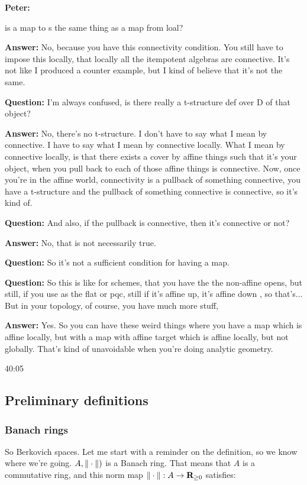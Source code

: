 \begin{example}
\textbf{Peter:} 

is a map to s the same thing as a map from loal? 

\textbf{Answer:} No, because you have this connectivity condition. You still have to impose this locally, that locally all the itempotent algebras are connective. It's not like I produced a counter example, but I kind of believe that it's not the same.

\textbf{Question:} I'm always confused, is there really a t-structure def over D of that object? 

\textbf{Answer:} No, there's no t-structure. I don't have to say what I mean by connective. I have to say what I mean by connective locally. What I mean by connective locally, is that there exists a cover by affine things such that it's your object, when you pull back to each of those affine things is connective. Now, once you're in the affine world, connectivity is a pullback of something connective, you have a t-structure and the pullback of something connective is connective, so it's kind of. 

\textbf{Question:} And also, if the pullback is connective, then it's connective or not? 

\textbf{Answer:} No, that is not necessarily true.

\textbf{Question:} So it's not a sufficient condition for having a map. 

\textbf{Question:} So this is like for schemes, that you have the the non-affine opens, but still, if you use as the flat or pqc, still if it's affine up, it's affine down , so that's... But in your topology, of course, you have much more stuff, 

\textbf{Answer:} Yes. So you can have these weird things where you have a map which is affine locally, but with a map with affine target which is affine locally, but not globally. That's kind of unavoidable when you're doing analytic geometry.

\begin{unfinished}{40:05}
\subsection{Preliminary definitions} \label{subsec:preliminary_definitions}
\subsubsection{Banach rings} \label{subsubsec:banach_rings}
So Berkovich spaces. Let me start with a reminder on the definition, so we know where we're going. $A, \| \cdot \|)$ is a Banach ring. That means that $A$ is a commutative ring, and this norm map $\| \cdot \|: A \to \mathbf R_{\geq 0}$ satisfies:


\end{unfinished}
\end{example}
